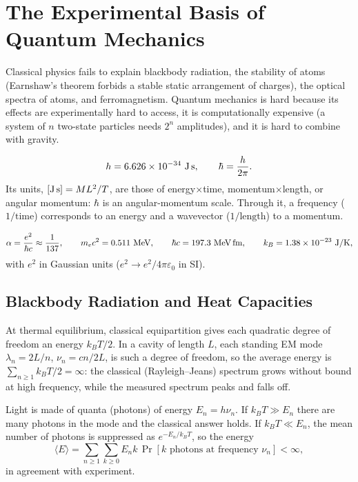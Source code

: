\chapter{The Experimental Basis of Quantum Mechanics}
\label{ch:experiment}

Classical physics fails to explain blackbody radiation, the stability of atoms (Earnshaw's theorem forbids a stable static arrangement of charges), the optical spectra of atoms, and ferromagnetism. Quantum mechanics is hard because its effects are experimentally hard to access, it is computationally expensive (a system of $n$ two-state particles needs $2^n$ amplitudes), and it is hard to combine with gravity.

\begin{definition}
\[
    h = 6.626\times10^{-34}\ \text{J\,s},
    \qquad
    \hbar = \frac{h}{2\pi}.
\]
Its units, $[\text{J\,s}] = ML^2/T$, are those of energy$\times$time, momentum$\times$length, or angular momentum: $\hbar$ is an angular-momentum scale. Through it, a frequency ($1/\text{time}$) corresponds to an energy and a wavevector ($1/\text{length}$) to a momentum.
\end{definition}

\begin{fact}
\[
    \alpha = \frac{e^2}{\hbar c}\approx\frac{1}{137},
    \qquad
    m_ec^2 = 0.511\ \text{MeV},
    \qquad
    \hbar c = 197.3\ \text{MeV\,fm},
    \qquad
    k_B = 1.38\times10^{-23}\ \text{J/K},
\]
with $e^2$ in Gaussian units ($e^2\to e^2/4\pi\varepsilon_0$ in SI).
\end{fact}

\section{Blackbody Radiation and Heat Capacities}

At thermal equilibrium, classical equipartition gives each quadratic degree of freedom an energy $k_BT/2$. In a cavity of length $L$, each standing EM mode $\lambda_n = 2L/n$, $\nu_n = cn/2L$, is such a degree of freedom, so the average energy is $\sum_{n\ge1}k_BT/2 = \infty$: the classical (Rayleigh--Jeans) spectrum grows without bound at high frequency, while the measured spectrum peaks and falls off.

\begin{fact}
Light is made of quanta (photons) of energy $E_n = h\nu_n$. If $k_BT\gg E_n$ there are many photons in the mode and the classical answer holds. If $k_BT\ll E_n$, the mean number of photons is suppressed as $e^{-E_n/k_BT}$, so the energy
\[
    \langle E\rangle = \sum_{n\ge1}\sum_{k\ge0}E_nk\,\Pr[k\text{ photons at frequency }\nu_n] < \infty,
\]
in agreement with experiment.
\end{fact}

